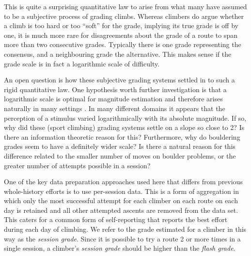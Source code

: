 \documentclass{article}
\begin{document}
{This is quite a surprising quantitative law to arise from what many have assumed to be a subjective process of grading climbs. Whereas climbers do argue whether a climb is too hard or too ``soft'' for the grade, implying its true grade is off by one, it is much more rare for disagreements about the grade of a route to span more than two consecutive grades. Typically there is one grade representing the consensus, and a neighbouring grade the alternative. This makes sense if the grade scale is in fact a logarithmic scale of difficulty.  

An open question is how these subjective grading systems settled in to such a rigid quantitative law. One hypothesis worth further investigation is that a logarithmic scale is optimal for magnitude estimation and therefore arises naturally in many settings \cite{portugal2011weber}. In many different domains it appears that the perception of a stimulus varied logarithmically with its absolute magnitude. If so, why did these (sport climbing) grading systems settle on a slope so close to 2? Is there an information theoretic reason for this? Furthermore, why do bouldering grades seem to have a definitely wider scale? Is there a natural reason for this difference related to the smaller number of moves on boulder problems, or the greater number of attempts possible in a session?

One of the key data preparation approaches used here that differs from previous whole-history efforts is to use per-session data. This is a form of aggregation in which only the most successful attempt for each climber on each route on each day is retained and all other attempted ascents are removed from the data set. This caters for a common form of self-reporting that reports the best effort during each day of climbing. We refer to the grade estimated for a climber in this way as the {\it session grade}. Since it is possible to try a route 2 or more times in a single session, a climber's {\it session grade} should be higher than the {\it flash grade}. 

}
\end{document}
